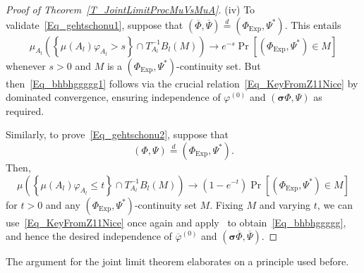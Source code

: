 \documentclass[AHL,Unicode,longabstracts]{cedram}
\newcommand{\Expl}{\mathrm{Exp}}
\newcommand{\bfsig}{\boldsymbol{\sigma}}
\begin{document}
\begin{proof}[{Proof of Theorem~\ref{T_JointLimitProcMuVsMuA}}]
\noindent (iv) To validate~\eqref{Eq_gehtschonu1}, suppose that $(\overline{\Phi},\overline{\Psi})\overset{d}{=}(\Phi_{\Expl},\Psi^{\ast})$. This entails
\[
\mu_{A_{l}}\left(\left\{\mu(A_{l})\varphi_{A_{l}}>s\right\}\cap T_{A_{l}}^{-1} B_{l}(M)\right) \longrightarrow e^{-s}\Pr\left[\left(\Phi_{\Expl},\Psi^{\ast}\right)\in M\right]
\]
whenever $s>0$ and $M$ is a $(\Phi_{\Expl},\Psi^{\ast})$-continuity set. But then~\eqref{Eq_bhbhggggg1} follows via the crucial relation~\eqref{Eq_KeyFromZ11Nice} by dominated convergence, ensuring independence of $\varphi^{(0)}$ and $(\bfsig\Phi,\Psi)$ as required.


Similarly, to prove~\eqref{Eq_gehtschonu2}, suppose that
\[
(\Phi,\Psi)\overset{d}{=}\left(\Phi_{\Expl},\Psi^{\ast}\right).
\]
Then,
\[
\mu\left(\left\{\mu(A_{l})\varphi_{A_{l}}\leq t\right\}\cap T_{A_{l}}^{-1} B_{l}(M)\right) \longrightarrow\left(1-e^{-t}\right)\Pr\left[\left(\Phi_{\Expl},\Psi^{\ast}\right)\in M\right]
\]
for $t>0$ and any $(\Phi_{\Expl},\Psi^{\ast})$-continuity set $M$. Fixing $M$ and varying $t$, we can use~\eqref{Eq_KeyFromZ11Nice} once again and apply~\cite[Lemma~4.2]{Z11} to obtain~\eqref{Eq_bhbhggggg}, and hence the desired independence of $\overline{\varphi}^{(0)}$ and $(\bfsig\overline{\Phi},\overline{\Psi})$.
\end{proof}


The argument for the joint limit theorem elaborates on a principle used before.
\end{document}
